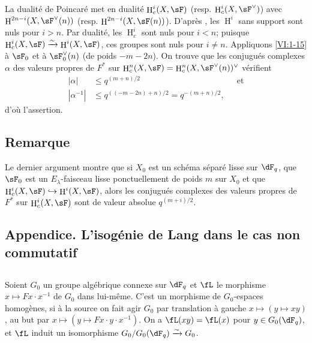 \documentclass[oneside]{book}
\DeclareMathOperator{\h}{H}
\newcommand{\iso}{\xrightarrow\sim}
\theoremstyle{sga-source}
\theoremstyle{sga-source-dash}
\theoremstyle{sga-source-dotdash}
\theoremstyle{sga-source-number-note-dash}
\theoremstyle{sga-source-note-number-dotdash}
\theoremstyle{sga-source-example-dotdash}
\theoremstyle{sga-source-inline-number}
\theoremstyle{sga-source-bare-number}
\theoremstyle{sga-source}
\newcommand{\PrintPage}[1]{}\newcommand{\MathPage}[1]{}\newcommand{\PrintCite}[2]{#1}\newcommand{\var}[3]{#1}
\begin{document}
La dualité de Poincaré met en dualité $\h_c^i(X,\sF)$ (resp. 
$\h_c^i(X,\sF^\vee)$) avec $\h^{2n-i}(X,\sF^\vee(n))$ (resp. 
$\h^{2n-i}(X,\sF(n))$). D'après \cite[XIV 3.2]{sga4}, les $\h^i$ sans support 
sont nuls pour $i>n$. Par dualité, les $\h_c^i$ sont nuls pour $i<n$; puisque 
$\h_c^i(X,\sF) \iso \h^i(X,\sF)$, ces groupes sont nuls pour $i\ne n$. 
\var{Appliquons \ref{VI:1-15}}{Appliquons \ref{VI:1-17}}{S45-SOL-0722} à $\sF_0$ et à $\sF_0^\vee(n)$ (de poids 
$-m-2n$). On trouve que les conjugués complexes $\alpha$ des valeurs propres 
de $F^\ast$ sur $\h_c^n(X,\sF) = \h_c^n(X,\sF^\vee(n))^\vee$ vérifient 
\begin{align*}
  |\alpha| &\leqslant q^{(m+n)/2} && \text{et} \\
  |\alpha^{-1}| &\leqslant q^{((-m-2n)+n)/2} = q^{-(m+n)/2} \text{,}
\end{align*}
d'où l'assertion. 





\subsection{Remarque}\label{VI:1-21}

Le dernier argument montre que si $X_0$ est un schéma séparé lisse sur 
$\dF_q$, que $\sF_0$ est un $E_\lambda$-faisceau lisse ponctuellement de poids 
$m$ sur $X_0$ et que $\h_c^i(X,\sF) \hookrightarrow \h^i(X,\sF)$, alors les 
conjugués complexes des valeurs propres de $F^\ast$ sur $\h_c^i(X,\sF)$ sont 
de valeur absolue $q^{(m+i)/2}$. 





\PrintPage{181}
\subsection*{Appendice. L'isogénie de Lang dans le cas non commutatif}




\subsection{}\label{VI:1-22}

Soient $G_0$ un groupe algébrique connexe sur $\dF_q$ et $\fL$ le morphisme 
$x\mapsto F x\cdot x^{-1}$ de $G_0$ dans lui-même. C'est un morphisme de 
$G_0$-espaces homogènes, si à la source on fait agir $G_0$ par translation 
à gauche $x\mapsto (y\mapsto x y)$, au but par 
$x\mapsto (y\mapsto F x\cdot y\cdot x^{-1})$. On a $\fL(xy) = \fL(x)$ pour 
$y\in G_0(\dF_q)$, et $\fL$ induit un isomorphisme $G_0/G_0(\dF_q)\iso G_0$. 
\end{document}
